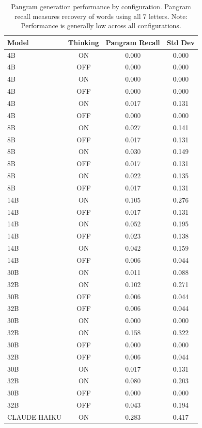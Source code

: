 \begin{table}[t]
\centering
\small
\caption{Pangram generation performance by configuration. Pangram recall measures recovery of words using all 7 letters. Note: Performance is generally low across all configurations.}
\label{tab:pangram_performance}
\begin{tabular}{lccc}
\toprule
\textbf{Model} & \textbf{Thinking} & \textbf{Pangram Recall} & \textbf{Std Dev} \\
\midrule
4B  & ON  & 0.000 & 0.000 \\
4B  & OFF & 0.000 & 0.000 \\
4B  & ON  & 0.000 & 0.000 \\
4B  & OFF & 0.000 & 0.000 \\
4B  & ON  & 0.017 & 0.131 \\
4B  & OFF & 0.000 & 0.000 \\
8B  & ON  & 0.027 & 0.141 \\
8B  & OFF & 0.017 & 0.131 \\
8B  & ON  & 0.030 & 0.149 \\
8B  & OFF & 0.017 & 0.131 \\
8B  & ON  & 0.022 & 0.135 \\
8B  & OFF & 0.017 & 0.131 \\
14B & ON  & 0.105 & 0.276 \\
14B & OFF & 0.017 & 0.131 \\
14B & ON  & 0.052 & 0.195 \\
14B & OFF & 0.023 & 0.138 \\
14B & ON  & 0.042 & 0.159 \\
14B & OFF & 0.006 & 0.044 \\
30B & ON  & 0.011 & 0.088 \\
32B & ON  & 0.102 & 0.271 \\
30B & OFF & 0.006 & 0.044 \\
32B & OFF & 0.006 & 0.044 \\
30B & ON  & 0.000 & 0.000 \\
32B & ON  & 0.158 & 0.322 \\
30B & OFF & 0.000 & 0.000 \\
32B & OFF & 0.006 & 0.044 \\
30B & ON  & 0.017 & 0.131 \\
32B & ON  & 0.080 & 0.203 \\
30B & OFF & 0.000 & 0.000 \\
32B & OFF & 0.043 & 0.194 \\
CLAUDE-HAIKU & ON  & 0.283 & 0.417 \\

\end{tabular}
\end{table}
